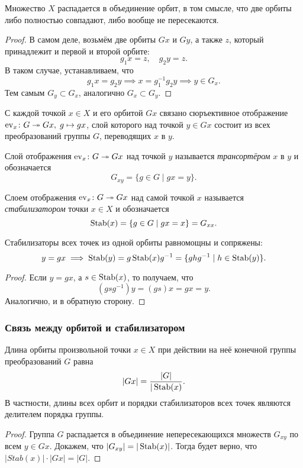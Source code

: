 \begin{proposition}
    Множество $X$ распадается в объединение орбит, в том смысле, что две орбиты либо полностью совпадают, либо вообще не пересекаются. 
\end{proposition}
\begin{proof}
    В самом деле, возьмём две орбиты $Gx$ и $Gy$, а также $z$, который принадлежит и первой и второй орбите: \[g_1x = z, \quad g_2y = z.\]
    В таком случае, устанавливаем, что $$g_1x = g_2y \implies x = g_1^{-1}g_2y \implies y \in G_x.$$
    Тем самым $G_y \subset G_x$, аналогично $G_x \subset G_y$.
\end{proof}

С каждой точкой $x \in X$ и его орбитой $Gx$ связано сюръективное отображение $\operatorname{ev}_x \colon G \twoheadrightarrow Gx,\; g \mapsto gx$, слой которого над точкой $y \in Gx$ состоит из всех преобразований группы $G$, переводящих $x$ в $y$. 
\begin{definition}
    [Транспортёр]
    Слой отображения $\operatorname{ev}_x \colon G \twoheadrightarrow Gx$ над точкой $y$ называется \emph{трансортёром} $x$ в $y$ и обозначается \[G_{xy} = \{g \in G \mid gx = y\}.\]
\end{definition}
\begin{definition}[Стабилизатор]
    Слоем отображения $\operatorname{ev}_x \colon G \twoheadrightarrow Gx$ над самой точкой $x$ называется \emph{стабилизатором} точки $x \in X$ и обозначается \[ \operatorname{Stab}(x) = \{g \in G \mid gx = x \} = G_{xx}.\]
\end{definition}

\begin{proposition}
    Стабилизаторы всех точек из одной орбиты равномощны и сопряжены: \[
    y = gx \implies \operatorname{Stab}(y) = g \operatorname{Stab}(x) g^{-1} = \{ ghg^{-1} \mid h \in \operatorname{Stab}(y) \}.\]
    \begin{proof}
        Если $y = gx$, а $s \in \operatorname{Stab}(x)$, то получаем, что $$(gsg^{-1})y = (gs)x = gx = y.$$
        Аналогично, и в обратную сторону.
    \end{proof}
\end{proposition}
\subsubsection{Связь между орбитой и стабилизатором}

\begin{proposition}
Длина орбиты произвольной точки $x \in X$ при действии на неё конечной группы преобразований $G$ равна $$|Gx| = \frac{|G|}{|\operatorname{Stab}(x)}.$$ В частности, длины всех орбит и порядки стабилизаторов всех точек являются делителем порядка группы.
\end{proposition}
\begin{proof}
    Группа $G$ распадается в объединение непересекающихся множеств $G_{xy}$ по всем $y \in Gx$. Докажем, что $|G_{xy}| = |\operatorname{Stab}(x)|$. Тогда будет верно, что $|Stab(x)| \cdot |Gx| = |G|$.
\end{proof}
